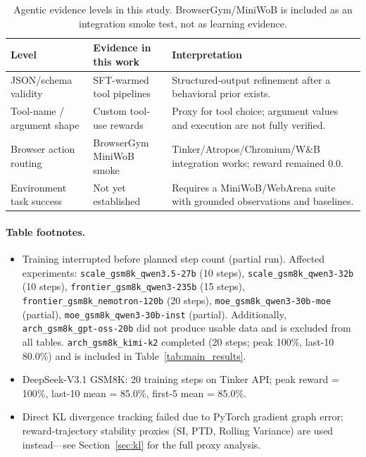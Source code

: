 \begin{table}[htbp]
\centering
\caption{Agentic evidence levels in this study. BrowserGym/MiniWoB is included
as an integration smoke test, not as learning evidence.}
\label{tab:agentic_levels}
\small
\begin{tabular}{@{}p{3.2cm}p{4.1cm}p{5.0cm}@{}}
\toprule
\textbf{Level} & \textbf{Evidence in this work} & \textbf{Interpretation} \\
\midrule
JSON/schema validity & SFT-warmed tool pipelines & Structured-output refinement after a behavioral prior exists.\\
Tool-name / argument shape & Custom tool-use rewards & Proxy for tool choice; argument values and execution are not fully verified.\\
Browser action routing & BrowserGym MiniWoB smoke & Tinker/Atropos/Chromium/W\&B integration works; reward remained 0.0.\\
Environment task success & Not yet established & Requires a MiniWoB/WebArena suite with grounded observations and baselines.\\
\bottomrule
\end{tabular}
\end{table}

\paragraph{Table footnotes.}
\begin{itemize}
    \item[$^\dagger$] Training interrupted before planned step count (partial run).
    Affected experiments:
    \texttt{scale\_gsm8k\_qwen3.5-27b} (10 steps), \texttt{scale\_gsm8k\_qwen3-32b} (10 steps),
    \texttt{frontier\_gsm8k\_qwen3-235b} (15 steps), \texttt{frontier\_gsm8k\_nemotron-120b} (20 steps),
    \texttt{moe\_gsm8k\_qwen3-30b-moe} (partial), \texttt{moe\_gsm8k\_qwen3-30b-inst} (partial).
    Additionally, \texttt{arch\_gsm8k\_gpt-oss-20b} did not produce usable data and is excluded
    from all tables. \texttt{arch\_gsm8k\_kimi-k2} completed (20 steps; peak 100\%, last-10 80.0\%)
    and is included in Table~\ref{tab:main_results}.
    \item[$^b$] DeepSeek-V3.1 GSM8K: 20 training steps on Tinker API;
    peak reward = 100\%, last-10 mean = 85.0\%, first-5 mean = 85.0\%.
    \item[$^h$] Direct KL divergence tracking failed due to PyTorch gradient graph error;
    reward-trajectory stability proxies (SI, PTD, Rolling Variance) are used
    instead---see Section~\ref{sec:kl} for the full proxy analysis.
\end{itemize}

